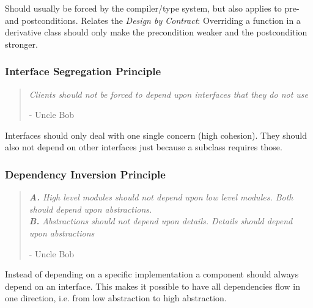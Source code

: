 Should usually be forced by the compiler/type system, but also applies to pre- and postconditions.
%
Relates the \emph{Design by Contract}: Overriding a function in a derivative class should only make
the precondition weaker and the postcondition stronger.


\subsubsection{Interface Segregation Principle}

\begin{quote}
  \textit{Clients should not be forced to depend upon interfaces that they do not use}

  - Uncle Bob
\end{quote}

Interfaces should only deal with one single concern (high cohesion). 
%
They should also not depend on other interfaces just because a subclass requires those.
%



\subsubsection{Dependency Inversion Principle}

\begin{quote}
  \textit{
    \textbf{A.} High level modules should not depend upon low level modules. Both should depend upon
  abstractions.\\
    \textbf{B.} Abstractions should not depend upon details. Details should depend upon
abstractions
  }

  - Uncle Bob
\end{quote}

Instead of depending on a specific implementation a component should always depend on an interface.
%
This makes it possible to have all dependencies flow in one direction, i.e. from low abstraction to
high abstraction.
